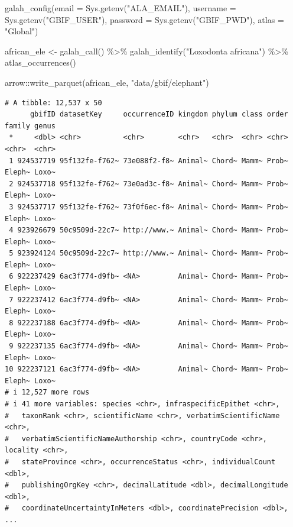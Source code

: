 \documentclass[
  letterpaper,
  DIV=11,
  numbers=noendperiod,
  oneside]{scrreprt}
\newenvironment{Shaded}{\begin{snugshade}}{\end{snugshade}}
\newcommand{\AttributeTok}[1]{\textcolor[rgb]{0.40,0.45,0.13}{#1}}
\newcommand{\FunctionTok}[1]{\textcolor[rgb]{0.28,0.35,0.67}{#1}}
\newcommand{\NormalTok}[1]{\textcolor[rgb]{0.00,0.23,0.31}{#1}}
\newcommand{\OtherTok}[1]{\textcolor[rgb]{0.00,0.23,0.31}{#1}}
\newcommand{\SpecialCharTok}[1]{\textcolor[rgb]{0.37,0.37,0.37}{#1}}
\newcommand{\StringTok}[1]{\textcolor[rgb]{0.13,0.47,0.30}{#1}}
\begin{document}
\begin{Shaded}
\begin{Highlighting}[]
\FunctionTok{galah\_config}\NormalTok{(}\AttributeTok{email =} \FunctionTok{Sys.getenv}\NormalTok{(}\StringTok{"ALA\_EMAIL"}\NormalTok{),}
             \AttributeTok{username =} \FunctionTok{Sys.getenv}\NormalTok{(}\StringTok{"GBIF\_USER"}\NormalTok{),}
             \AttributeTok{password =} \FunctionTok{Sys.getenv}\NormalTok{(}\StringTok{"GBIF\_PWD"}\NormalTok{),}
             \AttributeTok{atlas =} \StringTok{"Global"}\NormalTok{)}

\NormalTok{african\_ele }\OtherTok{\textless{}{-}} \FunctionTok{galah\_call}\NormalTok{() }\SpecialCharTok{\%\textgreater{}\%} 
  \FunctionTok{galah\_identify}\NormalTok{(}\StringTok{"Loxodonta africana"}\NormalTok{) }\SpecialCharTok{\%\textgreater{}\%} 
  \FunctionTok{atlas\_occurrences}\NormalTok{()}

\NormalTok{arrow}\SpecialCharTok{::}\FunctionTok{write\_parquet}\NormalTok{(african\_ele, }\StringTok{"data/gbif/elephant"}\NormalTok{)}
\end{Highlighting}
\end{Shaded}

\begin{verbatim}
# A tibble: 12,537 x 50
      gbifID datasetKey     occurrenceID kingdom phylum class order family genus
 *     <dbl> <chr>          <chr>        <chr>   <chr>  <chr> <chr> <chr>  <chr>
 1 924537719 95f132fe-f762~ 73e088f2-f8~ Animal~ Chord~ Mamm~ Prob~ Eleph~ Loxo~
 2 924537718 95f132fe-f762~ 73e0ad3c-f8~ Animal~ Chord~ Mamm~ Prob~ Eleph~ Loxo~
 3 924537717 95f132fe-f762~ 73f0f6ec-f8~ Animal~ Chord~ Mamm~ Prob~ Eleph~ Loxo~
 4 923926679 50c9509d-22c7~ http://www.~ Animal~ Chord~ Mamm~ Prob~ Eleph~ Loxo~
 5 923924124 50c9509d-22c7~ http://www.~ Animal~ Chord~ Mamm~ Prob~ Eleph~ Loxo~
 6 922237429 6ac3f774-d9fb~ <NA>         Animal~ Chord~ Mamm~ Prob~ Eleph~ Loxo~
 7 922237412 6ac3f774-d9fb~ <NA>         Animal~ Chord~ Mamm~ Prob~ Eleph~ Loxo~
 8 922237188 6ac3f774-d9fb~ <NA>         Animal~ Chord~ Mamm~ Prob~ Eleph~ Loxo~
 9 922237135 6ac3f774-d9fb~ <NA>         Animal~ Chord~ Mamm~ Prob~ Eleph~ Loxo~
10 922237121 6ac3f774-d9fb~ <NA>         Animal~ Chord~ Mamm~ Prob~ Eleph~ Loxo~
# i 12,527 more rows
# i 41 more variables: species <chr>, infraspecificEpithet <chr>,
#   taxonRank <chr>, scientificName <chr>, verbatimScientificName <chr>,
#   verbatimScientificNameAuthorship <chr>, countryCode <chr>, locality <chr>,
#   stateProvince <chr>, occurrenceStatus <chr>, individualCount <dbl>,
#   publishingOrgKey <chr>, decimalLatitude <dbl>, decimalLongitude <dbl>,
#   coordinateUncertaintyInMeters <dbl>, coordinatePrecision <dbl>, ...
\end{verbatim}
\end{document}
